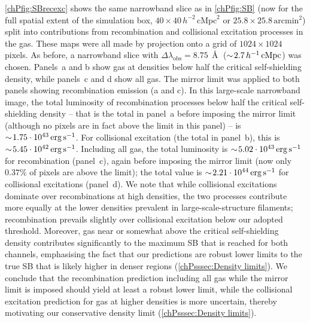 \cref{chPfig:SBrecexc} shows the same narrowband slice as in \cref{chPfig:SB} (now for the full spatial extent of the simulation box, $40 \times 40 \, h^{-2} \, \mathrm{cMpc}^2$ or $25.8 \times 25.8 \, \mathrm{arcmin}^2$) split into contributions from recombination and collisional excitation processes in the gas. These maps were all made by projection onto a grid of $1024 \times 1024$ pixels. As before, a narrowband slice with $\Delta \lambda_\text{obs} = 8.75 \, \Angstrom$ ($\sim \! 2.7 \, h^{-1} \, \mathrm{cMpc}$) was chosen. Panels~a and b show gas at densities below half the critical self-shielding density, while panels~c and d show all gas. The mirror limit was applied to both panels showing recombination emission (a and c). In this large-scale narrowband image, the total luminosity of recombination processes below half the critical self-shielding density -- that is the total in panel~a before imposing the mirror limit (although no pixels are in fact above the limit in this panel) -- is $\sim \! 1.75 \cdot 10^{43} \, \mathrm{erg \, s^{-1}}$. For collisional excitation (the total in panel~b), this is $\sim \! 5.45 \cdot 10^{42} \, \mathrm{erg \, s^{-1}}$. Including all gas, the total luminosity is $\sim \! 5.02 \cdot 10^{43} \, \mathrm{erg \, s^{-1}}$ for recombination (panel~c), again before imposing the mirror limit (now only $0.37\%$ of pixels are above the limit); the total value is $\sim \! 2.21 \cdot 10^{44} \, \mathrm{erg \, s^{-1}}$ for collisional excitations (panel~d). We note that while collisional excitations dominate over recombinations at high densities, the two processes contribute more equally at the lower densities prevalent in large-scale-structure filaments; recombination prevails slightly over collisional excitation below our adopted threshold. Moreover, gas near or somewhat above the critical self-shielding density contributes significantly to the maximum SB that is reached for both channels, emphasising the fact that our predictions are robust lower limits to the true SB that is likely higher in denser regions (\cref{chPsssec:Density limits}). We conclude that the recombination prediction including all gas while the mirror limit is imposed should yield at least a robust lower limit, while the collisional excitation prediction for gas at higher densities is more uncertain, thereby motivating our conservative density limit (\cref{chPsssec:Density limits}).

